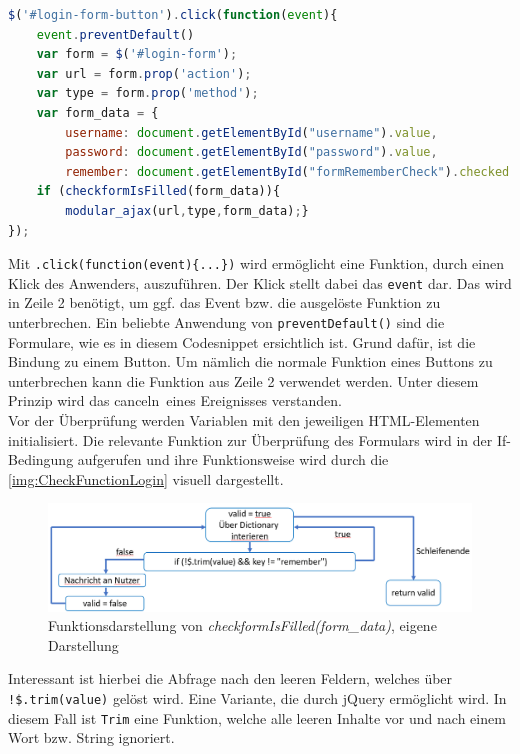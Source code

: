 \documentclass[a4paper,titlepage,halfparskip,12pt]{scrreprt}
\begin{document}
\begin{onehalfspacing}
\begin{lstlisting}[language=Javascript,caption=Angehängte Funktion an ein HTML-Element,label={lst:JSLoginButton}]
$('#login-form-button').click(function(event){
	event.preventDefault()
	var form = $('#login-form');
	var url = form.prop('action');
	var type = form.prop('method');
	var form_data = {
		username: document.getElementById("username").value,
		password: document.getElementById("password").value,
		remember: document.getElementById("formRememberCheck").checked }
	if (checkformIsFilled(form_data)){
		modular_ajax(url,type,form_data);}
});
\end{lstlisting}
Mit \texttt{.click(function(event)\{...\})} wird ermöglicht eine Funktion, durch einen Klick des Anwenders, auszuführen. Der Klick stellt dabei das \texttt{event} dar. Das wird in Zeile 2 benötigt, um ggf. das Event bzw. die ausgelöste Funktion zu unterbrechen. Ein beliebte Anwendung von \texttt{preventDefault()} sind die Formulare, wie es in diesem Codesnippet ersichtlich ist. Grund dafür, ist die Bindung zu einem Button. Um nämlich die normale Funktion eines Buttons zu unterbrechen kann die Funktion aus Zeile 2 verwendet werden. Unter diesem Prinzip wird das \glqq canceln\grqq\ eines Ereignisses verstanden. \cite{w3schoolsPrevDefault}\\
Vor der Überprüfung werden Variablen mit den jeweiligen \ac{HTML}-Elementen initialisiert. Die relevante Funktion zur Überprüfung des Formulars wird in der If-Bedingung aufgerufen und ihre Funktionsweise wird durch die \autoref{img:CheckFunctionLogin} visuell dargestellt.%
\begin{figure}[h]
	\centering
	\includegraphics[scale=0.8]{images/FunktionUeberpruefenLogin}
	\caption{Funktionsdarstellung von \textit{checkformIsFilled(form\_data)}, eigene Darstellung}
	\label{img:CheckFunctionLogin}
\end{figure}
Interessant ist hierbei die Abfrage nach den leeren Feldern, welches über \texttt{!\$.trim(value)} gelöst wird. Eine Variante, die durch jQuery ermöglicht wird. In diesem Fall ist \texttt{Trim} eine Funktion, welche alle leeren Inhalte vor und nach einem Wort bzw. String ignoriert. \cite{jQueryTrim}\\ 

\end{onehalfspacing}
\end{document}
